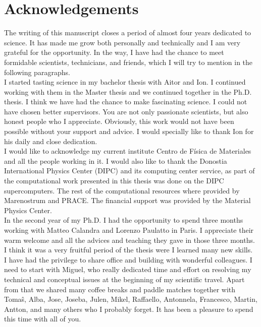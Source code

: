 
\chapter*{Acknowledgements} %

The writing of this manuscript closes a period of almost four years dedicated to science. It has made me grow both 
personally and technically and I am very grateful for the opportunity. In the way, I have had the chance to meet 
formidable scientists, technicians, and friends, which I will try to mention in the following paragraphs. \\

I started tasting science in my bachelor thesis with Aitor and Ion. I continued working with them in the Master 
thesis and we continued together in the Ph.D. thesis. I think we have had the chance to make fascinating science. I 
could not have chosen better supervisors. You are not only passionate scientists, but also honest people who I 
appreciate. Obviously, this work would not have been possible without your support and advice. I would specially like 
to thank Ion for his daily and close dedication. \\

I would like to acknowledge my current institute Centro de F\'isica de Materiales and all the people working in it. I 
would also like to thank the Donostia International Physics Center (DIPC) and its computing center service, as part 
of the computational work presented in this thesis was done on the DIPC supercomputers. The rest of the computational
resources where provided by Marenostrum and PRACE. The financial support was provided by the Material Physics 
Center. \\

In the second year of my Ph.D. I had the opportunity to spend three months working with Matteo Calandra and Lorenzo 
Paulatto in Paris. I appreciate their warm welcome and all the advices and teaching they gave in those three months. 
I think it was a very fruitful period of the thesis were I learned many new skills. \\

I have had the privilege to share office and building with wonderful colleagues. I need to start with Miguel, who 
really dedicated time and effort on resolving my technical and conceptual issues at the beginning of my scientific 
travel. Apart from that we shared many coffee breaks and paddle matches together with Toma\^s, Alba, Jose, Joseba, 
Julen, Mikel, Raffaello, Antonnela, Francesco, Martin, Antton, and many others who I probably forget. It has been a 
pleasure to spend this time with all of you. \\


